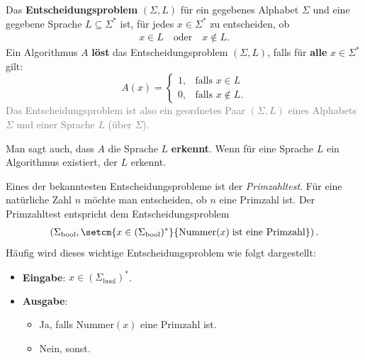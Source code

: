 \begin{frame}[fragile]
\begin{mydefinition}[Entscheidungsproblem]\label{mydefinition:Entscheidungsproblem}
Das \textbf{Entscheidungsproblem} $(\Sigma,L)$ für ein gegebenes Alphabet $\Sigma$ und eine gegebene Sprache $L\subseteq \Sigma^*$ ist, für jedes $x\in\Sigma^*$ zu entscheiden, ob
\begin{align*}
	x\in L\quad \text{oder}\quad x\notin L.
\end{align*}
Ein Algorithmus $A$ \textbf{löst} das Entscheidungsproblem $(\Sigma,L)$, falls für \textbf{alle} $x\in\Sigma^*$ gilt:
\[
	A(x) =
	\begin{cases}
		1, & \text{falls } x\in L     \\
		0, & \text{falls } x\notin L.
	\end{cases}
\]
\textcolor{Gray}{Das Entscheidungsproblem ist also ein geordnetes Paar $(\Sigma,L)$ eines Alphabets $\Sigma$ und einer Sprache $L$ (über $\Sigma$).}
\end{mydefinition}
Man sagt auch, dass $A$ die Sprache $L$ \textbf{erkennt}. Wenn für eine Sprache $L$ ein Algorithmus existiert, der $L$ erkennt.
\end{frame}

\begin{frame}[fragile]
\begin{myexample}\label{myexample:is_prime}
Eines der bekanntesten Entscheidungsprobleme ist der \textit{Primzahltest}. Für eine natürliche Zahl $n$ möchte man entscheiden, ob $n$ eine Primzahl ist. Der Primzahltest entspricht dem Entscheidungsproblem
\begin{align*}
	\left(\Sigma_{\text{bool}},\setcm{x\in(\Sigma_{\text{bool}})^*}{\text{Nummer}(x)\;\text{ist eine Primzahl}}\right).
\end{align*}
Häufig wird dieses wichtige Entscheidungsproblem wie folgt dargestellt:
\begin{itemize}
	\item \textbf{Eingabe}: $x\in(\Sigma_{\text{bool}})^*$.
	\item \textbf{Ausgabe}:
	      \begin{itemize}
		      \item Ja, falls $\text{Nummer}(x)$ eine Primzahl ist.
		      \item Nein, sonst.
	      \end{itemize}
\end{itemize}
\end{myexample}
\end{frame}